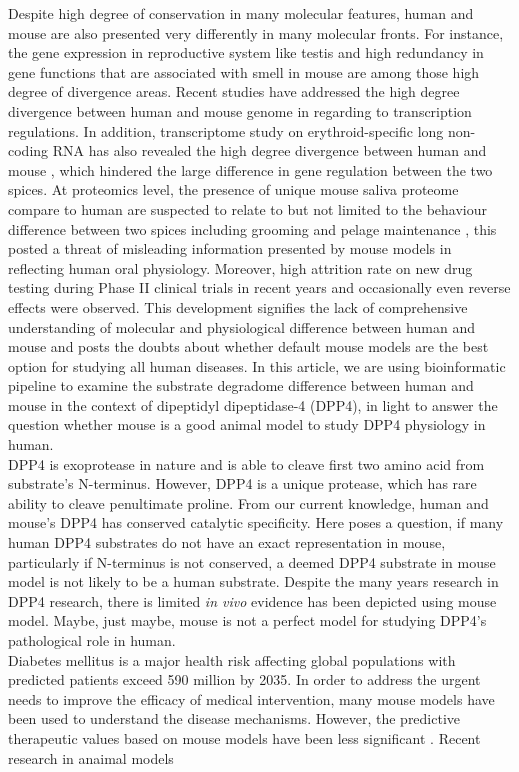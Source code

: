 Despite high degree of conservation in many molecular features, human and mouse are also presented very differently in many molecular fronts. For instance, the gene expression in reproductive system like testis \cite{Chan_2009, Brawand_2011, Necsulea_2014} and high redundancy in gene functions that are associated with smell in mouse \cite{Gilad_2009, Gilad_2003, Young_2002} are among those high degree of divergence areas. Recent studies have addressed the high degree divergence between human and mouse genome in regarding to transcription regulations. \cite{25409824} In addition, transcriptome study on erythroid-specific long non-coding RNA has also revealed the high degree divergence between human and mouse \cite{An_2015}, which hindered the large difference in gene regulation between the two spices. At proteomics level, the presence of unique mouse saliva proteome compare to human are suspected to relate to but not limited to the behaviour difference between two spices including grooming and pelage maintenance \cite{Karn_2013}, this posted a threat of misleading information presented by mouse models in reflecting human oral physiology. Moreover, high attrition rate on new drug testing during Phase II clinical trials in recent years \cite{Arrowsmith_2011} and occasionally even reverse effects were observed. This development signifies the lack of comprehensive understanding of molecular and physiological difference between human and mouse \cite{de_Magalh_es_2014} and posts the doubts about whether default mouse models are the best option for studying all human diseases. In this article, we are using bioinformatic pipeline to examine the substrate degradome difference between human and mouse in the context of dipeptidyl dipeptidase-4 (DPP4), in light to answer the question whether mouse is a good animal model to study DPP4 physiology in human.
\\

DPP4 is exoprotease in nature and is able to cleave first two amino acid from substrate's N-terminus. However, DPP4 is a unique protease, which has rare ability to cleave penultimate proline. From our current knowledge, human and mouse's DPP4 has conserved catalytic specificity. Here poses a question, if many human DPP4 substrates do not have an exact representation in mouse, particularly if N-terminus is not conserved, a deemed DPP4 substrate in mouse model is not likely to be a human substrate. Despite the many years research in DPP4 research, there is limited \textit{in vivo} evidence has been depicted using mouse model. Maybe, just maybe, mouse is not a perfect model for studying DPP4's pathological role in human. \\

Diabetes mellitus is a major health risk affecting global populations with predicted patients exceed 590 million by 2035. \cite{IDF_Diabetes_Atlas_Group_2015} In order to address the urgent needs to improve the efficacy of medical intervention, many mouse models have been used to understand the disease mechanisms. However, the predictive therapeutic values based on mouse models have been less significant \cite{Renner_2016, Hay_2014}. Recent research in anaimal models 

\cite{Justice_2011}